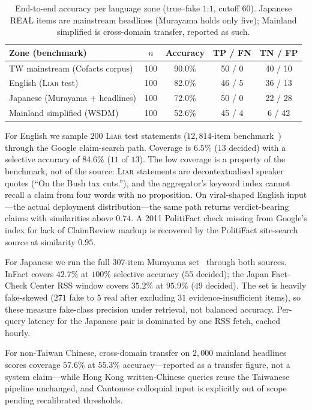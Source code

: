 \documentclass[twoside]{llncs}
\begin{document}
\begin{table}[!htbp]
\caption{End-to-end accuracy per language zone (true--fake $1$:$1$, cutoff $60$). Japanese REAL items are mainstream headlines (Murayama holds only five); Mainland simplified is cross-domain transfer, reported as such.}
\label{tab:multieval}
\centering
\begin{tabular}{lcccc}
\toprule
\textbf{Zone (benchmark)} & \textbf{$n$} & \textbf{Accuracy} & \textbf{TP / FN} & \textbf{TN / FP} \\
\midrule
TW mainstream (Cofacts corpus) & 100 & 90.0\% & 50 / 0 & 40 / 10 \\
English (\textsc{Liar} test) & 100 & 82.0\% & 46 / 5 & 36 / 13 \\
Japanese (Murayama + headlines) & 100 & 72.0\% & 50 / 0 & 22 / 28 \\
Mainland simplified (WSDM) & 100 & 52.6\% & 45 / 4 & 6 / 42 \\
\bottomrule
\end{tabular}
\end{table}

For English we sample $200$ \textsc{Liar} test statements ($12{,}814$-item benchmark~\cite{wang2017liar}) through the Google claim-search path. Coverage is $6.5\%$ ($13$ decided) with a selective accuracy of $84.6\%$ ($11$ of $13$). The low coverage is a property of the benchmark, not of the source: \textsc{Liar} statements are decontextualised speaker quotes (``On the Bush tax cuts.''), and the aggregator's keyword index cannot recall a claim from four words with no proposition. On viral-shaped English input---the actual deployment distribution---the same path returns verdict-bearing claims with similarities above $0.74$. A 2011 PolitiFact check missing from Google's index for lack of ClaimReview markup is recovered by the PolitiFact site-search source at similarity $0.95$.

For Japanese we run the full $307$-item Murayama set~\cite{murayama2022japanese} through both sources. InFact covers $42.7\%$ at $100\%$ selective accuracy ($55$ decided); the Japan Fact-Check Center RSS window covers $35.2\%$ at $95.9\%$ ($49$ decided). The set is heavily fake-skewed ($271$ fake to $5$ real after excluding $31$ evidence-insufficient items), so these measure fake-class precision under retrieval, not balanced accuracy. Per-query latency for the Japanese pair is dominated by one RSS fetch, cached hourly.

For non-Taiwan Chinese, cross-domain transfer on $2{,}000$ mainland headlines scores coverage $57.6\%$ at $55.3\%$ accuracy---reported as a transfer figure, not a system claim---while Hong Kong written-Chinese queries reuse the Taiwanese pipeline unchanged, and Cantonese colloquial input is explicitly out of scope pending recalibrated thresholds.
\end{document}

